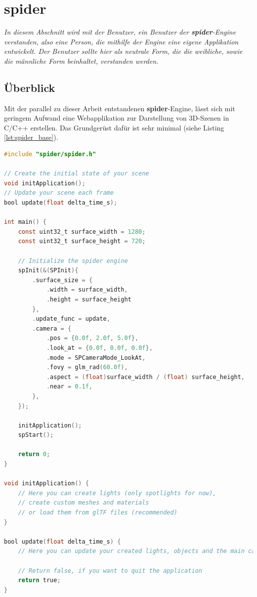 \documentclass[oneside]{ausarbeitung}
\newcommand*{\quotize}[1]{\glqq #1\grqq}
\begin{document}
\section{spider}
\label{sec:spider}
\textit{In diesem Abschnitt wird mit \quotize{der Benutzer}, ein Benutzer der \textbf{spider}-Engine verstanden, also eine Person, die mithilfe der Engine eine eigene Applikation entwickelt. \quotize{Der Benutzer} sollte hier als neutrale Form, die die weibliche, sowie die männliche Form beinhaltet, verstanden werden.}
\subsection{Überblick}
\label{sub:overview}
Mit der parallel zu dieser Arbeit entstandenen \textbf{spider}-Engine, lässt sich mit geringem Aufwand eine Webapplikation zur Darstellung von 3D-Szenen in C/C++ erstellen.
Das Grundgerüst dafür ist sehr minimal (siehe Listing \ref{lst:spider_base}).

\begin{minipage}{\textwidth}
\begin{lstlisting}[language=C, label={lst:spider_base}, caption={Grundgerüst einer Applikation mit der \textbf{spider}-Engine}]
#include "spider/spider.h"

// Create the initial state of your scene
void initApplication();
// Update your scene each frame
bool update(float delta_time_s);

int main() {
	const uint32_t surface_width = 1280;
	const uint32_t surface_height = 720;

	// Initialize the spider engine
	spInit(&(SPInit){
		.surface_size = {
			.width = surface_width,
			.height = surface_height
		},
		.update_func = update,
		.camera = {
			.pos = {0.0f, 2.0f, 5.0f},
			.look_at = {0.0f, 0.0f, 0.0f},
			.mode = SPCameraMode_LookAt,
			.fovy = glm_rad(60.0f),
			.aspect = (float)surface_width / (float) surface_height,
			.near = 0.1f,
		},
	});	
	
	initApplication();
	spStart();
	
	return 0;
}

void initApplication() {
	// Here you can create lights (only spotlights for now),
	// create custom meshes and materials 
	// or load them from glTF files (recommended)
}

bool update(float delta_time_s) {
	// Here you can update your created lights, objects and the main camera
	
	// Return false, if you want to quit the application
	return true;
}
\end{lstlisting}
\end{minipage}
\end{document}
